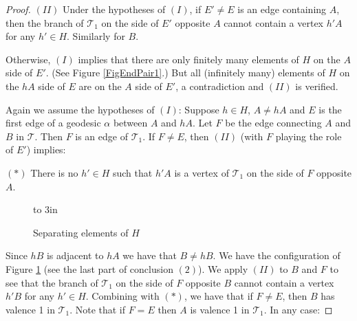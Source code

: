 \documentclass[10pt,a4paper]{amsart}
\begin{document}
\begin{proof}
$(II)$ Under the hypotheses of $(I)$,  if $E'\ne E$ is an edge containing $A$, then the branch of $\mathcal T_1$ on the side of $E'$ opposite $A$ cannot contain a vertex $h'A$ for any $h'\in H$. Similarly for $B$. 

\medskip

Otherwise, $(I)$ implies that there are only finitely many elements of $H$ on the $A$ side of $E'$. (See Figure \ref{FigEndPair1}.) But all  (infinitely many) elements of $H$ on the $hA$ side of $E$ are on the $A$ side of $E'$, a contradiction and $(II)$ is verified.  





\medskip

Again we assume the hypotheses of $(I)$: Suppose $h\in H$, $A\ne hA$ and $E$ is the first edge of a geodesic $\alpha$ between $A$ and $hA$. Let $F$ be the edge connecting $A$ and $B$ in $\mathcal T$. Then $F$ is an edge of $\mathcal T_1$. 
If $F\ne E$, then $(II)$ (with $F$ playing the role of $E'$) implies:

\medskip

\noindent $(\ast)$ There is no $h'\in H$ such that $h'A$ is a vertex of $\mathcal T_1$ on the side of $F$ opposite $A$. 

\medskip

\begin{figure}
\vbox to 3in{\vspace {-1.5in} \hspace {.6in}
\hspace{-1 in}

\vss }
\vspace{-1.7in}
\caption{Separating elements of $H$} 
\label{FigEndPair2}
\end{figure}

\noindent Since $hB$ is adjacent to $hA$ we have that $B\ne hB$. We have the configuration of Figure \ref{FigEndPair2} (see the last part of conclusion $(2)$). We apply $(II)$ to $B$ and $F$ to see that the branch of $\mathcal T_1$ on the side of $F$ opposite $B$ cannot contain a vertex $h'B$ for any $h'\in H$. Combining with $(\ast)$, we have that if $F\ne E$, then $B$ has valence 1 in $\mathcal T_1$.  Note that if $F=E$ then $A$ is valence 1 in $\mathcal T_1$. In any case: 

\medskip


\end{proof}
\end{document}
